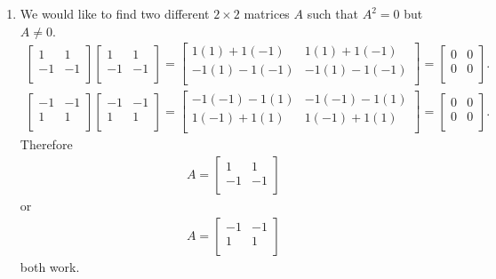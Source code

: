 \documentclass[12pt]{article}
\begin{document}
\begin{enumerate}
  \item
    We would like to find two different $2 \times 2$ matrices $A$
    such that $A^{2} = 0$ but $A \neq 0$.
    \begin{align*}
      \begin{bmatrix}
        1  & 1\\
        -1 & -1\\
      \end{bmatrix}
      \begin{bmatrix}
        1  & 1\\
        -1 & -1\\
      \end{bmatrix}
      =
      \begin{bmatrix}
        1(1) + 1(-1) & 1(1) + 1(-1)\\
        -1(1) - 1(-1) & -1(1) - 1(-1)\\
      \end{bmatrix}
      =
      \begin{bmatrix}
        0 & 0\\
        0 & 0\\
      \end{bmatrix}.
    \end{align*}
    \begin{align*}
      \begin{bmatrix}
        -1  & -1\\
        1 & 1\\
      \end{bmatrix}
      \begin{bmatrix}
        -1  & -1\\
        1 & 1\\
      \end{bmatrix}
      =
      \begin{bmatrix}
        -1(-1) - 1(1) & -1(-1) - 1(1)\\
        1(-1) + 1(1) & 1(-1) + 1(1)\\
      \end{bmatrix}
      =
      \begin{bmatrix}
        0 & 0\\
        0 & 0\\
      \end{bmatrix}.
    \end{align*}
    Therefore
    \begin{align*}
      A =
      \begin{bmatrix}
        1  & 1\\
        -1 & -1\\
      \end{bmatrix}
    \end{align*}
    or
    \begin{align*}
      A =
      \begin{bmatrix}
        -1  & -1\\
        1 & 1\\
      \end{bmatrix}
    \end{align*}
    both work.


\end{enumerate}
\end{document}

